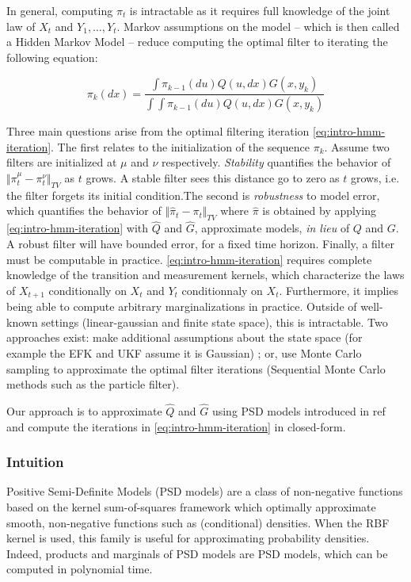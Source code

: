 In general, computing $\pi_t$ is intractable as it requires full knowledge of the joint law of $X_t$  and $Y_1, \ldots, Y_t$. Markov assumptions on the model -- which is then called a Hidden Markov Model -- reduce computing the optimal filter to iterating the following equation:

\begin{equation}\label{eq:intro-hmm-iteration}
\pi_k(dx) = \frac{\int \pi_{k-1}(du)Q(u, dx)G(x, y_k)}{\int \int \pi_{k-1}(du)Q(u, dx)G(x, y_k)}
\end{equation}

Three main questions arise from the optimal filtering iteration \cref{eq:intro-hmm-iteration}. The first relates to the initialization of the sequence $\pi_k$. Assume two filters are initialized at $\mu$ and $\nu$ respectively. \emph{Stability} quantifies the behavior of $\Vert \pi_t^\mu - \pi_t^\nu \Vert_{TV}$ as $t$ grows. A stable filter sees this distance go to zero as $t$ grows, i.e. the filter forgets its initial condition.The second is \emph{robustness} to model error, which quantifies the behavior of $\Vert \hat\pi_t - \pi_t\Vert_{TV}$ where $\hat \pi$ is obtained by applying \cref{eq:intro-hmm-iteration} with $\hat Q$ and $\hat G$, approximate models, \emph{in lieu} of $Q$ and $G$. A robust filter will have bounded error, for a fixed time horizon. Finally, a filter must be computable in practice. \cref{eq:intro-hmm-iteration} requires complete knowledge of the transition and measurement kernels, which characterize the laws of $X_{t+1}$ conditionally on $X_t$ and $Y_t$ conditionnaly on $X_t$. Furthermore, it implies being able to compute arbitrary marginalizations in practice. Outside of well-known settings (linear-gaussian and finite state space), this is intractable. Two approaches exist: make additional assumptions about the state space (for example the EFK and UKF assume it is Gaussian) ; or, use Monte Carlo sampling to approximate the optimal filter iterations (Sequential Monte Carlo methods such as the particle filter).

Our approach is to approximate $\hat Q$ and $\hat G$ using PSD models introduced in ref and compute the iterations in \cref{eq:intro-hmm-iteration} in closed-form.

\subsubsection{Intuition}
Positive Semi-Definite Models (PSD models) are a class of non-negative functions based on the kernel sum-of-squares framework which optimally approximate smooth, non-negative functions such as (conditional) densities. When the RBF kernel is used, this family is useful for approximating probability densities. Indeed, products and marginals of PSD models are PSD models, which can be computed in polynomial time.

